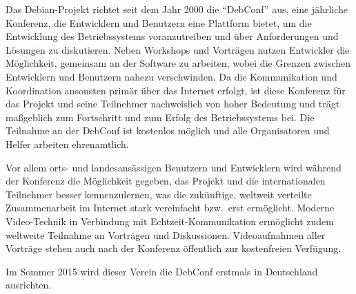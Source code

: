 \documentclass[draft]{scrartcl}
\begin{document}
Das Debian-Projekt richtet seit dem Jahr 2000 die "`DebConf"' aus, eine
jährliche Konferenz, die Entwicklern und Benutzern eine Plattform bietet, um
die Entwicklung des Betriebs\-systems voranzutreiben und über Anforderungen und
Lösungen zu diskutieren. Neben Workshops und Vorträgen nutzen Entwickler die
Möglichkeit, gemeinsam an der Software zu arbeiten, wobei die Grenzen zwischen
Entwicklern und Benutzern nahezu verschwinden. Da die Kommunikation und
Koordination ansonsten primär über das Internet erfolgt, ist diese Konferenz
für das Projekt und seine Teilnehmer nachweislich von hoher Bedeutung und
trägt maßgeblich zum Fortschritt und zum Erfolg des Betriebs\-systems bei. Die
Teilnahme an der DebConf ist kostenlos möglich und alle Organisatoren und
Helfer arbeiten ehrenamtlich.

Vor allem orts- und landesansässigen Benutzern und Entwicklern wird während der
Konferenz die Möglichkeit gegeben, das Projekt und die internationalen
Teilnehmer besser kennenzulernen, was die zukünftige, weltweit verteilte
Zusammenarbeit im Internet stark vereinfacht bzw.\ erst ermöglicht. Moderne
Video-Technik in Verbindung mit Echtzeit-Kommunikation ermöglicht zudem
weltweite Teilnahme an Vorträgen und Diskussionen. Videoaufnahmen aller
Vorträge stehen auch nach der Konferenz öffentlich zur kostenfreien Verfügung.

Im Sommer 2015 wird dieser Verein die DebConf erstmals in Deutschland
ausrichten.

\normalsize
\end{document}
